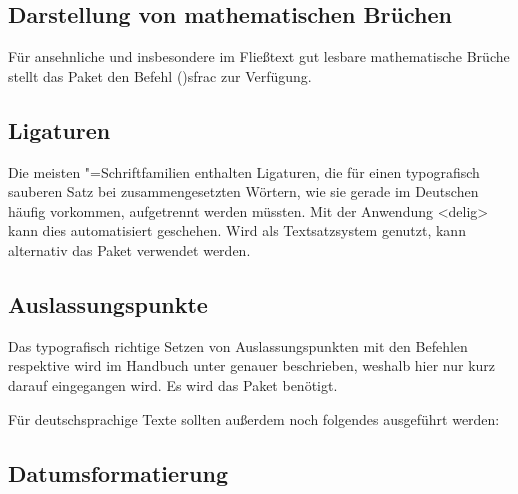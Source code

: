 \documentclass[%
  english,ngerman,%
  cdgeometry=no,DIV=12,%
  cd=false,cdfont=false,cdtitle=true,%
  headings=normal,%
  automark,%
  listof=toc,%
]{tudscrartcl}
\begin{document}
\subsection{Darstellung von mathematischen Brüchen}

Für ansehnliche und insbesondere im Fließtext gut lesbare mathematische Brüche 
stellt das Paket  den Befehl \Macro(){sfrac} zur 
Verfügung.
%
\begin{Preamble}
\usepackage{xfrac}

\end{Preamble}



\subsection{Ligaturen}

Die meisten "=Schriftfamilien enthalten Ligaturen, die für 
einen typografisch sauberen Satz bei zusammengesetzten Wörtern, wie sie gerade 
im Deutschen häufig vorkommen, aufgetrennt werden müssten. Mit der Anwendung 
<delig> kann dies automatisiert geschehen. Wird 
 als Textsatzsystem genutzt, kann alternativ das Paket 
 verwendet werden.



\subsection{Auslassungspunkte}

Das typografisch richtige Setzen von Auslassungspunkten mit den Befehlen 
 respektive  wird im Handbuch unter 
 genauer 
beschrieben, weshalb hier nur kurz darauf eingegangen wird. Es wird das Paket 
 benötigt.
%
\begin{Preamble}
\usepackage{ellipsis}
\end{Preamble}
%
Für deutschsprachige Texte sollten außerdem noch folgendes ausgeführt werden:
%
\begin{Preamble}
\let\ellipsispunctuation\relax

\end{Preamble}



\subsection{Datumsformatierung}
\end{document}
